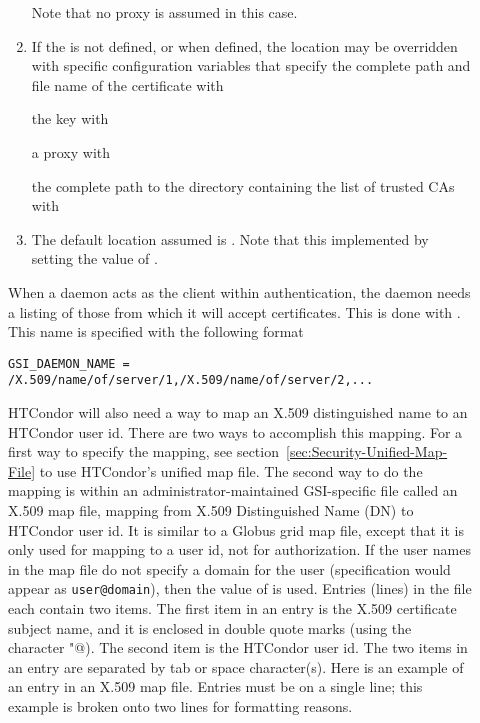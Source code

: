 \begin{description}
\begin{enumerate}
\normalsize
Note that no proxy is assumed in this case.
\item
If the  is not defined, 
or when defined,
the location may be overridden with specific configuration
variables that specify the complete path and file name of 
the certificate with
the key with
a proxy with
the complete path to the directory containing the list of trusted CAs with 
\item
The default location assumed is .
Note that this implemented by setting the value of  
.
\end{enumerate}

When a daemon acts as the client within authentication,
the daemon needs a listing of those from which it
will accept certificates.
This is done with .
This name is specified with the following format
\footnotesize
\begin{verbatim}
GSI_DAEMON_NAME = /X.509/name/of/server/1,/X.509/name/of/server/2,...
\end{verbatim}
\normalsize

HTCondor will also need a way to map an X.509 distinguished
name to an HTCondor user id.
There are two ways to accomplish this mapping.
For a first way to specify the mapping, see
section~\ref{sec:Security-Unified-Map-File}
to use HTCondor's unified map file.
The second way to do the mapping is within
an administrator-maintained GSI-specific file called an X.509 map file,
mapping from X.509 Distinguished Name (DN) to HTCondor user id.
It is similar to a Globus grid map file, except that it is only used for
mapping to a user id, not for authorization. 
If the user names in the
map file do not specify a domain for the user
(specification would appear as \verb|user@domain|),
then the value of  is used.
Entries (lines) in the file each contain two items.
The first item in an entry is the 
X.509 certificate subject name, and it is enclosed in double quote marks
(using the character \verb@"@).
The second item is the HTCondor user id.
The two items in an entry are separated by tab or space character(s).
Here is an example of an entry in an X.509 map file.
Entries must be on a single line; this example is broken
onto two lines for formatting reasons.


\end{description}
